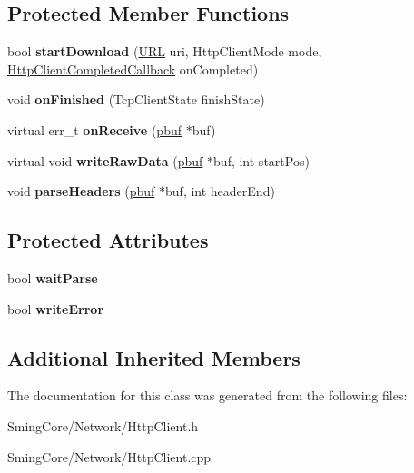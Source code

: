 \subsection*{Protected Member Functions}
\begin{DoxyCompactItemize}
\item 
\hypertarget{class_http_client_a448c7837bda53245ff1485e4e7db6827}{}bool {\bfseries start\+Download} (\hyperlink{class_u_r_l}{U\+R\+L} uri, Http\+Client\+Mode mode, \hyperlink{class_delegate}{Http\+Client\+Completed\+Callback} on\+Completed)\label{class_http_client_a448c7837bda53245ff1485e4e7db6827}

\item 
\hypertarget{class_http_client_a01b19eb339cb8a903a3c244aec115f06}{}void {\bfseries on\+Finished} (Tcp\+Client\+State finish\+State)\label{class_http_client_a01b19eb339cb8a903a3c244aec115f06}

\item 
\hypertarget{class_http_client_a5ea5de376338b972c616f00a669f7117}{}virtual err\+\_\+t {\bfseries on\+Receive} (\hyperlink{structpbuf}{pbuf} $\ast$buf)\label{class_http_client_a5ea5de376338b972c616f00a669f7117}

\item 
\hypertarget{class_http_client_a5d6e23d4703e6439787393399e0fb82c}{}virtual void {\bfseries write\+Raw\+Data} (\hyperlink{structpbuf}{pbuf} $\ast$buf, int start\+Pos)\label{class_http_client_a5d6e23d4703e6439787393399e0fb82c}

\item 
\hypertarget{class_http_client_a561c94d8a5ca8e662a20912747ae07da}{}void {\bfseries parse\+Headers} (\hyperlink{structpbuf}{pbuf} $\ast$buf, int header\+End)\label{class_http_client_a561c94d8a5ca8e662a20912747ae07da}

\end{DoxyCompactItemize}
\subsection*{Protected Attributes}
\begin{DoxyCompactItemize}
\item 
\hypertarget{class_http_client_a95b753e9c9b75aedf4f8635c7400be77}{}bool {\bfseries wait\+Parse}\label{class_http_client_a95b753e9c9b75aedf4f8635c7400be77}

\item 
\hypertarget{class_http_client_a7274432e4a75417628d8bb236f3da2e5}{}bool {\bfseries write\+Error}\label{class_http_client_a7274432e4a75417628d8bb236f3da2e5}

\end{DoxyCompactItemize}
\subsection*{Additional Inherited Members}


The documentation for this class was generated from the following files\+:\begin{DoxyCompactItemize}
\item 
Sming\+Core/\+Network/Http\+Client.\+h\item 
Sming\+Core/\+Network/Http\+Client.\+cpp\end{DoxyCompactItemize}
